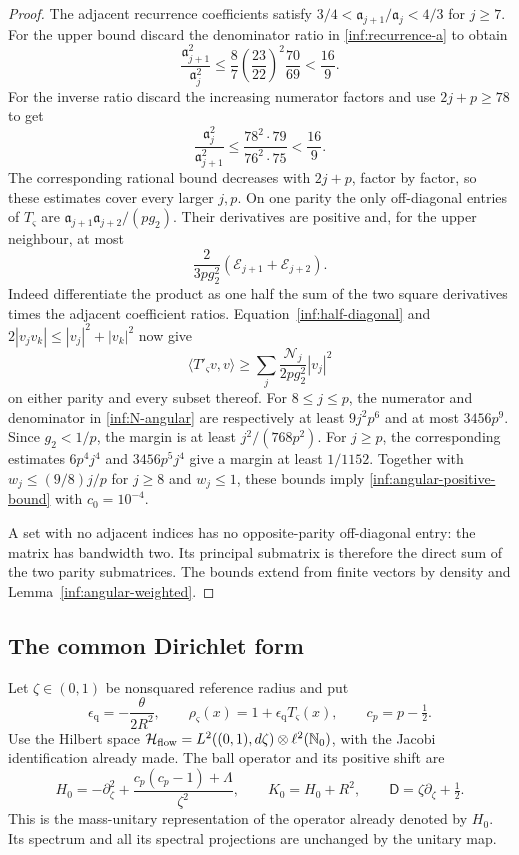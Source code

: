 \begin{proof}
The adjacent recurrence coefficients satisfy
$3/4<\mathfrak a_{j+1}/\mathfrak a_j<4/3$ for $j\ge7$.
For the upper bound discard the denominator ratio in
\eqref{inf:recurrence-a} to obtain
\[
 \frac{\mathfrak a_{j+1}^2}{\mathfrak a_j^2}
 \le\frac87\left(\frac{23}{22}\right)^2\frac{70}{69}<\frac{16}{9}.
\]
For the inverse ratio discard the increasing numerator factors and
use $2j+p\ge78$ to get
\[
 \frac{\mathfrak a_j^2}{\mathfrak a_{j+1}^2}
 \le\frac{78^2\cdot79}{76^2\cdot75}<\frac{16}{9}.
\]
The corresponding rational bound decreases with $2j+p$, factor by
factor, so these estimates cover every larger $j,p$.
On one parity the only off-diagonal entries of $T_\varsigma$ are
$\mathfrak a_{j+1}\mathfrak a_{j+2}/(pg_2)$.
Their derivatives are positive and, for the upper neighbour, at most
\[
 \frac{2}{3pg_2^2}(\mathcal E_{j+1}+\mathcal E_{j+2}).
\]
Indeed differentiate the product as one half the sum of the two
square derivatives times the adjacent coefficient ratios.
Equation~\eqref{inf:half-diagonal} and
$2|v_jv_k|\le|v_j|^2+|v_k|^2$ now give
\[
 \langle T'_\varsigma v,v\rangle\ge
 \sum_j\frac{\mathcal N_j}{2pg_2^2}|v_j|^2
\]
on either parity and every subset thereof.
For $8\le j\le p$, the numerator and denominator in
\eqref{inf:N-angular} are respectively at least $9j^2p^6$ and at
most $3456p^9$. Since $g_2<1/p$, the margin is at least
$j^2/(768p^2)$. For $j\ge p$, the corresponding estimates
$6p^4j^4$ and $3456p^5j^4$ give a margin at least $1/1152$.
Together with $w_j\le(9/8)j/p$ for $j\ge8$ and $w_j\le1$, these
bounds imply \eqref{inf:angular-positive-bound} with $c_0=10^{-4}$.

A set with no adjacent indices has no opposite-parity off-diagonal
entry: the matrix has bandwidth two. Its principal submatrix is
therefore the direct sum of the two parity submatrices.
The bounds extend from finite vectors by density and
Lemma~\ref{inf:angular-weighted}.
\end{proof}

\subsection{The common Dirichlet form}

Let $\zeta\in(0,1)$ be nonsquared reference radius and put
\[
 \epsilon_{\mathrm q}=-\frac{\theta}{2R^2},\qquad
 \rho_\varsigma(x)=1+\epsilon_{\mathrm q}T_\varsigma(x),\qquad c_p=p-\tfrac12.
\]
Use the Hilbert space
$\mathcal{H}_{\mathrm{flow}}=L^2((0,1),d\zeta)\otimes\ell^2(\mathbb N_0)$,
with the Jacobi identification already made. The ball operator and
its positive shift are
\begin{equation}\label{inf:flow-ball-operators}
 H_0=-\partial_\zeta^2+
          \frac{c_p(c_p-1)+\Lambda}{\zeta^2},\qquad
 K_0=H_0+R^2,\qquad
 \mathsf D=\zeta\partial_\zeta+\tfrac12.
\end{equation}
This is the mass-unitary representation of the operator already
denoted by $H_0$. Its spectrum and all its spectral projections
are unchanged by the unitary map.

